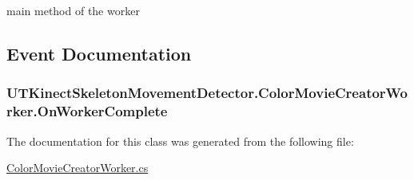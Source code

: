 main method of the worker 



\subsection{Event Documentation}
\hypertarget{class_u_t_kinect_skeleton_movement_detector_1_1_color_movie_creator_worker_aa3e3f57176cf63366e90893f7095aa83}{
\subsubsection[{On\-Worker\-Complete}]{ U\-T\-Kinect\-Skeleton\-Movement\-Detector.\-Color\-Movie\-Creator\-Worker.\-On\-Worker\-Complete}}\label{class_u_t_kinect_skeleton_movement_detector_1_1_color_movie_creator_worker_aa3e3f57176cf63366e90893f7095aa83}


The documentation for this class was generated from the following file\-:\begin{DoxyCompactItemize}
\item 
\hyperlink{_color_movie_creator_worker_8cs}{Color\-Movie\-Creator\-Worker.\-cs}\end{DoxyCompactItemize}

